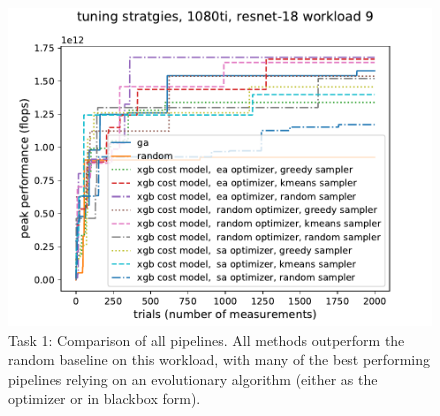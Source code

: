 \begin{figure}[ht]
\begin{center}
\includegraphics[width=\textwidth]{sys_figures/all1080tiresnet-18_9_.pdf}
\caption{Task 1: Comparison of all pipelines. All methods outperform the random baseline on this workload, with many of the best performing pipelines relying on an evolutionary algorithm (either as the optimizer or in blackbox form).}
\label{fig:all}
\end{center}
\end{figure}




